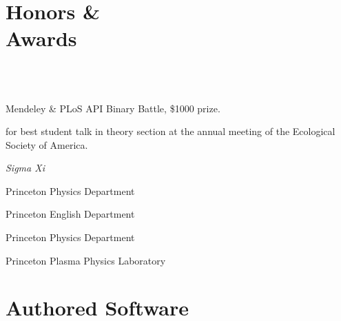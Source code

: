 \documentclass[margin]{res}
\begin{document}
\begin{resume}
\section{Honors \& \\ Awards}
\begin{format}
\\
\body\\
\end{format}


\begin{position} 
Mendeley \& PLoS API Binary Battle, \$1000 prize.
\end{position}

\begin{position} 
for best student talk in theory section at the annual meeting of the Ecological Society of America.   
\end{position}

\begin{position}  \emph{Sigma Xi}\end{position}

\begin{position} Princeton Physics Department \end{position}

\begin{position}Princeton English Department\end{position}

\begin{position}Princeton Physics Department\end{position}

\begin{position}Princeton Plasma Physics Laboratory \end{position}


\section{Authored Software} 


\end{resume}
\end{document}
